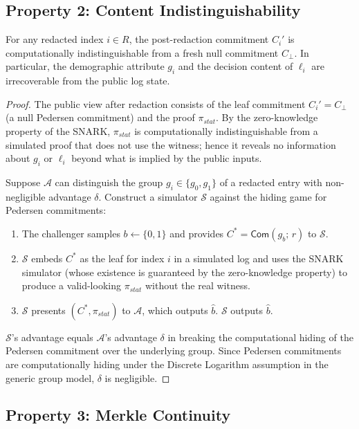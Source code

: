 \subsection{Property 2: Content Indistinguishability}
\label{subsec:privacy}

\begin{theorem}
  For any redacted index $i \in R$, the post-redaction commitment $C_i'$
  is computationally indistinguishable from a fresh null commitment
  $C_{\bot}$. In particular, the demographic attribute $g_i$ and the
  decision content of $\ell_i$ are irrecoverable from the public log
  state.
\end{theorem}

\begin{proof}
The public view after redaction consists of the leaf commitment $C_i' =
C_{\bot}$ (a null Pedersen commitment) and the proof $\pi_{\mathit{stat}}$.
By the zero-knowledge property of the SNARK, $\pi_{\mathit{stat}}$ is
computationally indistinguishable from a simulated proof that does not
use the witness; hence it reveals no information about $g_i$ or $\ell_i$
beyond what is implied by the public inputs.

Suppose $\mathcal{A}$ can distinguish the group $g_i \in \{g_0, g_1\}$
of a redacted entry with non-negligible advantage $\delta$. Construct a
simulator $\mathcal{S}$ against the hiding game for Pedersen commitments:
\begin{enumerate}
  \item The challenger samples $b \gets \{0,1\}$ and provides
  $C^* = \mathsf{Com}(g_b;\, r)$ to $\mathcal{S}$.
  \item $\mathcal{S}$ embeds $C^*$ as the leaf for index $i$ in a
  simulated log and uses the SNARK simulator (whose existence is
  guaranteed by the zero-knowledge property) to produce a valid-looking
  $\pi_{\mathit{stat}}$ without the real witness.
  \item $\mathcal{S}$ presents $(C^*, \pi_{\mathit{stat}})$ to
  $\mathcal{A}$, which outputs $\hat{b}$. $\mathcal{S}$ outputs
  $\hat{b}$.
\end{enumerate}
$\mathcal{S}$'s advantage equals $\mathcal{A}$'s advantage $\delta$ in
breaking the computational hiding of the Pedersen commitment over the
underlying group. Since Pedersen commitments are computationally hiding
under the Discrete Logarithm assumption in the generic group model,
$\delta$ is negligible.
\end{proof}

\subsection{Property 3: Merkle Continuity}
\label{subsec:continuity}

